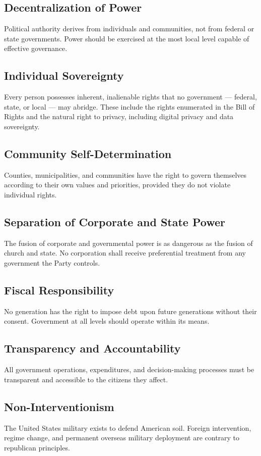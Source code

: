 \documentclass[11pt, letterpaper]{article}
\begin{document}
\subsection{Decentralization of Power}
Political authority derives from individuals and communities, not from federal or state governments. Power should be exercised at the most local level capable of effective governance.

\subsection{Individual Sovereignty}
Every person possesses inherent, inalienable rights that no government --- federal, state, or local --- may abridge. These include the rights enumerated in the Bill of Rights and the natural right to privacy, including digital privacy and data sovereignty.

\subsection{Community Self-Determination}
Counties, municipalities, and communities have the right to govern themselves according to their own values and priorities, provided they do not violate individual rights.

\subsection{Separation of Corporate and State Power}
The fusion of corporate and governmental power is as dangerous as the fusion of church and state. No corporation shall receive preferential treatment from any government the Party controls.

\subsection{Fiscal Responsibility}
No generation has the right to impose debt upon future generations without their consent. Government at all levels should operate within its means.

\subsection{Transparency and Accountability}
All government operations, expenditures, and decision-making processes must be transparent and accessible to the citizens they affect.

\subsection{Non-Interventionism}
The United States military exists to defend American soil. Foreign intervention, regime change, and permanent overseas military deployment are contrary to republican principles.
\end{document}
